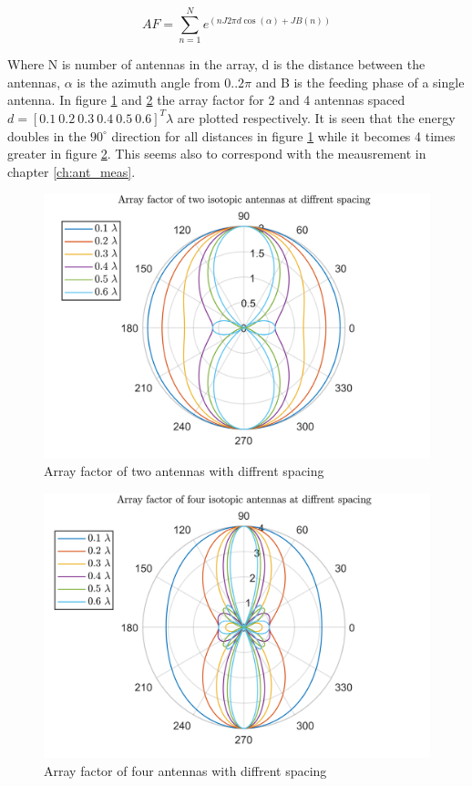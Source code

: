 \begin{equation}
AF = \sum_{n=1}^{N} e^{(n J 2\pi d \cos(\alpha)+JB(n))}
\end{equation}

Where N is number of antennas in the array, d is the distance between the antennas, $\alpha$ is the azimuth angle from $0..2\pi$ and B is the feeding phase of a single antenna. In figure \ref{fig:af_2ant} and \ref{fig:af_4ant} the array factor for 2 and 4 antennas spaced  $d = [0.1 \ 0.2 \ 0.3 \ 0.4 \ 0.5 \ 0.6]^T \lambda$ are plotted respectively. It is seen that the energy doubles in the $90^\circ$ direction for all distances in figure \ref{fig:af_2ant} while it becomes 4 times greater in figure \ref{fig:af_4ant}. This seems also to correspond with the meausrement in chapter \ref{ch:ant_meas}.   


\begin{figure}[H]
\centering 
\includegraphics[scale = 0.7]{figures/measurement/af_2ant.png}
\caption{Array factor of two antennas with diffrent spacing}
\label{fig:af_2ant}
\end{figure}


\begin{figure}[H]
\centering 
\includegraphics[scale = 0.7]{figures/measurement/af_4ant.png}
\caption{Array factor of four antennas with diffrent spacing}
\label{fig:af_4ant}
\end{figure}






